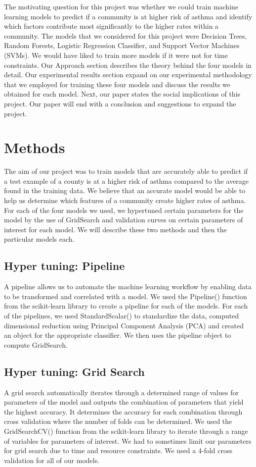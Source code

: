 \documentclass{article}
\begin{document}
The motivating question for this project was whether we could train machine learning models to predict if a community is at higher risk of asthma and identify which factors contribute most significantly to the higher rates within a community. The models that we considered for this project were Decision Trees, Random Forests, Logistic Regression Classifier, and Support Vector Machines (SVMs). We would have liked to train more models if it were not for time constraints. Our Approach section describes  the theory behind the four models in detail. Our experimental results section expand on our experimental methodology that we employed for training these four models and discuss the results we obtained for each model. Next, our paper states the social implications of this project. Our paper will end with a conclusion and suggestions to expand the project.

\section{Methods}
\label{methods}
The aim of our project was to train models that are accurately able to predict if a test example of a county is at a higher risk of asthma compared to the average found in the training data. We believe that an accurate model would be able to help us determine which features of a community create higher rates of asthma. For each of the four models we used, we hypertuned certain parameters for the model by the use of GridSearch and validation curves on certain parameters of interest for each model. We will describe these two methods and then the particular models each.

\subsection{Hyper tuning: Pipeline}
\label{Pipeline}
A pipeline allows us to automate the machine learning workflow by enabling data to be transformed and correlated with a model. We used the Pipeline() function from the scikit-learn library to create a pipeline for each of the models. For each of the pipelines, we used StandardScalar() to standardize the data, computed dimensional reduction using Principal Component Analysis (PCA) and created an object for the appropriate classifier. We then uses the pipeline object to compute GridSearch. 

\subsection{Hyper tuning: Grid Search}
\label{Grid Search}
A grid search automatically iterates through a determined range of values for parameters of the model and outputs the combination of parameters that yield the highest accuracy. It determines the accuracy for each combination through cross validation where the number of folds can be determined. We used the GridSearchCV() function from the scikit-learn library to iterate through a range of variables for parameters of interest. We had to sometimes limit our parameters for grid search due to time and resource constraints. We used a 4-fold cross validation for all of our models. 
\end{document}
